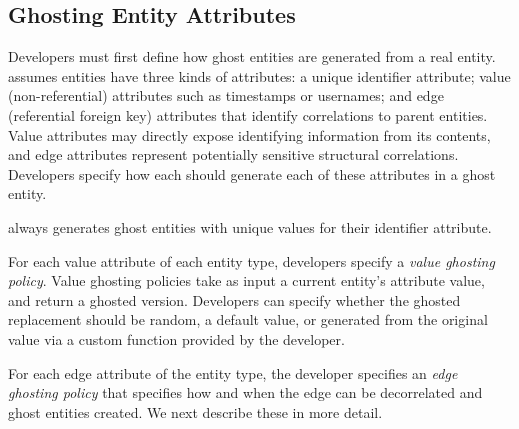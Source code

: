 \subsection{Ghosting Entity Attributes}
Developers must first define how ghost entities are generated from a real entity.
\sys assumes entities have three kinds of attributes: a unique identifier attribute; 
value (non-referential) attributes such as timestamps or usernames; and 
edge (referential foreign key) attributes that identify correlations to parent entities. 
Value attributes may directly expose identifying information from its
contents, and edge attributes represent potentially sensitive structural correlations. 
Developers specify how each \sys should generate each of these attributes in a ghost entity.

\sys always generates ghost entities with unique values for their identifier attribute.

For each value attribute of each entity type, developers specify a \emph{value ghosting policy}.
Value ghosting policies take as input a current entity's attribute value, and return a ghosted
version. Developers can specify whether the ghosted replacement should be random, a default value,
or generated from the original value via a custom function provided by the developer. 

For each edge attribute of the entity type, the developer specifies an \emph{edge ghosting policy}
that specifies how and when the edge can be decorrelated and ghost entities created. We next
describe these in more detail.


%


